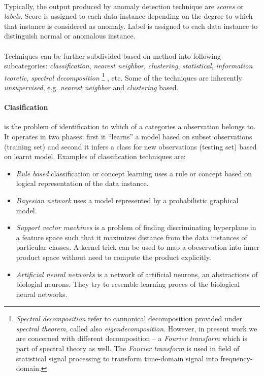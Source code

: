 \paragraph*{}

Typically, the output produced by anomaly detection technique are \emph{scores} or \emph{labels}.
Score is assigned to each data instance depending on the degree to which that instance is 
considered as anomaly. Label is assigned to each data instance to distinguish normal or anomalous instance.

\paragraph*{}

Techniques can be further subdivided based on method into following subcategories:
\emph{classification},
\emph{nearest neighbor}, \emph{clustering}, \emph{statistical}, \emph{information teoretic},
\emph{spectral decomposition}%
\footnote{
	\emph{Spectral decomposition} refer to cannonical decomposition provided under 
	\emph{spectral theorem}, called also \emph{eigendecomposition}.
	However, in present work we are concerned with different decomposition -- a 
	\emph{Fourier transform} which is part of spectral theory as well. 
	The \emph{Fourier transform} is used 
	in field of statistical signal processing to transform time-domain signal into frequency-domain.
	
}%
, etc. Some of the techniques are inherently \emph{unsupervised}, e.g. \emph{nearest neighbor} and 
\emph{clustering} based.

\paragraph*{Clasification} is the problem of identification to which of a 
	categories a observation belongs to. It operates in two phases: first it ``learns'' a model 
	based on subset observations (training set) and second it infers a class for new observations 
	(testing set) based on learnt model.
	Examples of classification techniques are:
	\begin{itemize}
		\item \emph{Rule based} classification or concept learning uses a rule or concept based on logical 
		representation of the data instance.
		\item \emph{Bayesian network} uses a model represented by a probabilistic graphical model.
		\item \emph{Support vector machines} is a problem of finding discriminating hyperplane in 
		a feature space such that it maximizes distance from the data instances of particular classes.
		A kernel trick can be used to map a obeservation into inner product space without need to compute 
		the product explicitly.
		\item \emph{Artificial neural networks} is a network of artificial neurons, an abstractions of 
		biologial neurons. They try to resemble learning proces of the biological neural networks.
	\end{itemize}
